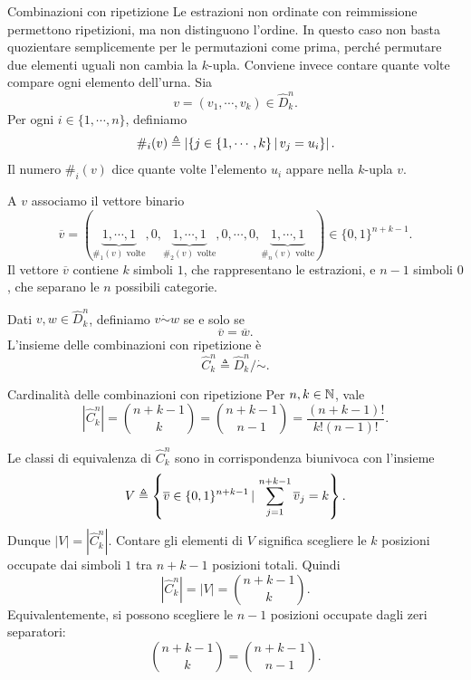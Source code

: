 \documentclass[a4paper]{article}
\begin{document}
\begin{snippetdefinition}{Combinazioni con ripetizione}
    Le estrazioni non ordinate con reimmissione permettono ripetizioni, ma non distinguono l'ordine.
    In questo caso non basta quozientare semplicemente per le permutazioni come prima, perché permutare due elementi uguali non cambia la \(k\)-upla.
    Conviene invece contare quante volte compare ogni elemento dell'urna.
    Sia
    \[
        v=(v_1,\cdots,v_k)\in \hat D_k^n.
    \]
    Per ogni \(i\in\{1,\cdots,n\}\), definiamo
    \[
        \#_i(v)
        \triangleq
        \left|
        \left\{
            j\in\{1,\cdots,k\}\,|\, v_j=u_i
        \right\}
        \right|.
    \]
    Il numero \(\#_i(v)\) dice quante volte l'elemento \(u_i\) appare nella \(k\)-upla \(v\).

    A \(v\) associamo il vettore binario
    \[
        \overline v
        =
        \left(
            \underbrace{1,\cdots,1}_{\#_1(v)\text{ volte}},
            0,
            \underbrace{1,\cdots,1}_{\#_2(v)\text{ volte}},
            0,
            \cdots,
            0,
            \underbrace{1,\cdots,1}_{\#_n(v)\text{ volte}}
        \right)
        \in\{0,1\}^{n+k-1}.
    \]
    Il vettore \(\overline v\) contiene \(k\) simboli \(1\), che rappresentano le estrazioni, e \(n-1\) simboli \(0\), che separano le \(n\) possibili categorie.

    Dati \(v,w\in\hat D_k^n\), definiamo \(v\dot\sim w\) se e solo se
    \[
        \overline v=\overline w.
    \]
    L'insieme delle combinazioni con ripetizione è
    \[
        \hat C_k^n
        \triangleq
        \hat D_k^n/{\dot\sim}.
    \]
\end{snippetdefinition}

\begin{snippetproposition}{Cardinalità delle combinazioni con ripetizione}
    Per \(n,k\in\mathbb{N}\), vale
    \[
        |\hat C_k^n|
        =
        \binom{n+k-1}{k}
        =
        \binom{n+k-1}{n-1}
        =
        \frac{(n+k-1)!}{k!(n-1)!}.
    \]
\end{snippetproposition}

\begin{snippetproof}{}
    Le classi di equivalenza di \(\hat C_k^n\) sono in corrispondenza biunivoca con l'insieme
    \[
        V
        \triangleq
        \left\{
            \overline v\in\{0,1\}^{n+k-1}
            \,|\,
            \sum_{j=1}^{n+k-1}\overline v_j=k
        \right\}.
    \]
    Dunque \(|V|=|\hat C_k^n|\).
    Contare gli elementi di \(V\) significa scegliere le \(k\) posizioni occupate dai simboli \(1\) tra \(n+k-1\) posizioni totali.
    Quindi
    \[
        |\hat C_k^n|
        =
        |V|
        =
        \binom{n+k-1}{k}.
    \]
    Equivalentemente, si possono scegliere le \(n-1\) posizioni occupate dagli zeri separatori:
    \[
        \binom{n+k-1}{k}
        =
        \binom{n+k-1}{n-1}.
    \]
\end{snippetproof}
\end{document}

